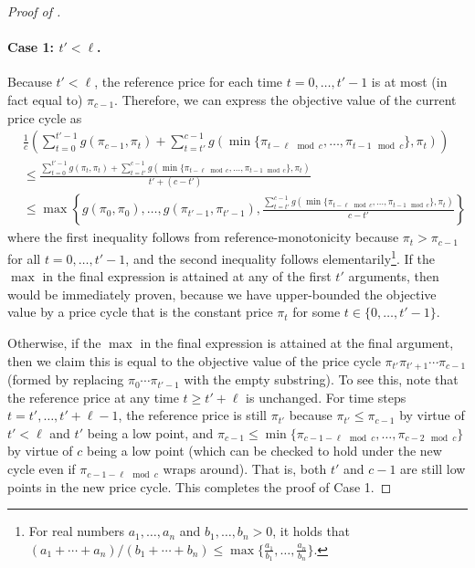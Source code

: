 \documentclass[format=acmsmall, review=false]{acmart}
\begin{document}
\begin{proof}[Proof of ]
\paragraph{Case 1: $t'<\ell$.}
Because $t'<\ell$, the reference price for each time $t=0,\ldots,t'-1$ is at most (in fact equal to) $\pi_{c-1}$.  Therefore, we can express the objective value of the current price cycle as
\begin{align*}
&\frac{1}{c}\left(\sum_{t=0}^{t'-1} g(\pi_{c-1},\pi_t) + \sum_{t=t'}^{c-1}g(\min\{\pi_{t-\ell\mod c},\ldots,\pi_{t-1\mod c}\},\pi_t)\right)
\\ &\le\frac{\sum_{t=0}^{t'-1} g(\pi_t,\pi_t) + \sum_{t=t'}^{c-1}g(\min\{\pi_{t-\ell\mod c},\ldots,\pi_{t-1\mod c}\},\pi_t)}{t'+(c-t')}
\\ &\le\max\left\{g(\pi_0,\pi_0),\ldots,g(\pi_{t'-1},\pi_{t'-1}),\frac{\sum_{t=t'}^{c-1}g(\min\{\pi_{t-\ell\mod c},\ldots,\pi_{t-1\mod c}\},\pi_t)}{c-t'}\right\}
\end{align*}
where the first inequality follows from reference-monotonicity because $\pi_t>\pi_{c-1}$ for all $t=0,\ldots,t'-1$, and the second inequality follows elementarily\footnote{For real numbers $a_1,\ldots,a_n$ and $b_1,\ldots,b_n>0$, it holds that $(a_1+\cdots+a_n)/(b_1+\cdots+b_n)\le \max\{\frac{a_1}{b_1},\ldots,\frac{a_n}{b_n}\}$.\label{ftnt:elem}}.
If the $\max$ in the final expression is attained at any of the first $t'$ arguments, then  would be immediately proven, because we have upper-bounded the objective value by a price cycle that is the constant price $\pi_t$ for some $t\in\{0,\ldots,t'-1\}$.

Otherwise, if the $\max$ in the final expression is attained at the final argument, then we claim this is equal to the objective value of the price cycle $\pi_{t'}\pi_{t'+1}\cdots\pi_{c-1}$ (formed by replacing $\pi_0\cdots\pi_{t'-1}$ with the empty substring).  To see this, note that the reference price at any time $t\ge t'+\ell$ is unchanged.  For time steps $t=t',\ldots,t'+\ell-1$, the reference price is still $\pi_{t'}$ because $\pi_{t'}\le\pi_{c-1}$ by virtue of $t'<\ell$ and $t'$ being a low point, and $\pi_{c-1}\le\min\{\pi_{c-1-\ell\mod c},\ldots,\pi_{c-2\mod c}\}$ by virtue of $c$ being a low point (which can be checked to hold under the new cycle even if $\pi_{c-1-\ell\mod c}$ wraps around).  That is, both $t'$ and $c-1$ are still low points in the new price cycle.
This completes the proof of Case 1.


\end{proof}
\end{document}
